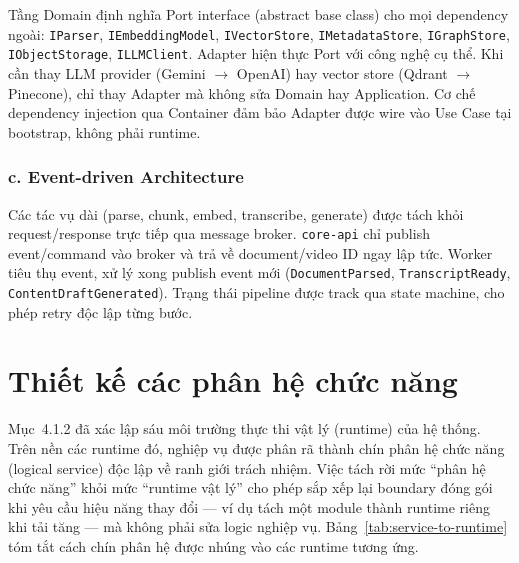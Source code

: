 Tầng Domain định nghĩa Port interface (abstract base class) cho mọi
dependency ngoài: \texttt{IParser}, \texttt{IEmbeddingModel},
\texttt{IVectorStore}, \texttt{IMetadataStore}, \texttt{IGraphStore},
\texttt{IObjectStorage}, \texttt{ILLMClient}. Adapter hiện thực Port với
công nghệ cụ thể. Khi cần thay LLM provider (Gemini $\to$ OpenAI) hay
vector store (Qdrant $\to$ Pinecone), chỉ thay Adapter mà không sửa
Domain hay Application. Cơ chế dependency injection qua Container đảm bảo
Adapter được wire vào Use Case tại bootstrap, không phải runtime.

\subsubsection*{c. Event-driven Architecture}

Các tác vụ dài (parse, chunk, embed, transcribe, generate) được tách khỏi
request/response trực tiếp qua message broker. \texttt{core-api} chỉ publish
event/command vào broker và trả về document/video ID ngay lập tức. Worker
tiêu thụ event, xử lý xong publish event mới (\texttt{DocumentParsed},
\texttt{TranscriptReady}, \texttt{ContentDraftGenerated}). Trạng thái pipeline
được track qua state machine, cho phép retry độc lập từng bước.

\section{Thiết kế các phân hệ chức năng}

Mục~4.1.2 đã xác lập sáu môi trường thực thi vật lý (runtime) của hệ thống.
Trên nền các runtime đó, nghiệp vụ được phân rã thành chín phân hệ chức năng
(logical service) độc lập về ranh giới trách nhiệm. Việc tách rời mức ``phân
hệ chức năng'' khỏi mức ``runtime vật lý'' cho phép sắp xếp lại boundary đóng
gói khi yêu cầu hiệu năng thay đổi --- ví dụ tách một module thành runtime
riêng khi tải tăng --- mà không phải sửa logic nghiệp vụ. Bảng~\ref{tab:service-to-runtime}
tóm tắt cách chín phân hệ được nhúng vào các runtime tương ứng.

